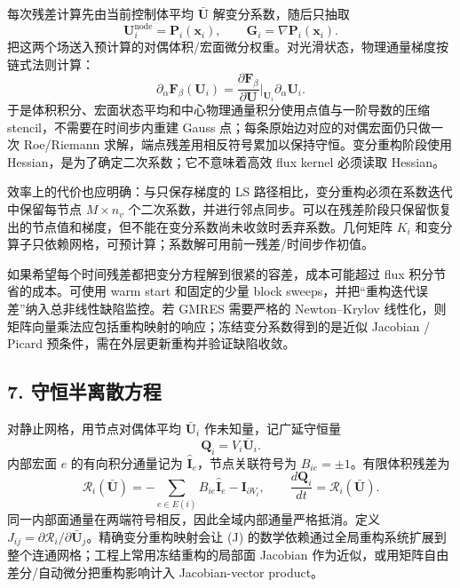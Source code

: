 \documentclass[
  12pt,
  UTF8]{ctexart}
\begin{document}
每次残差计算先由当前控制体平均 \(\bar{\boldsymbol U}\)
解变分系数，随后只抽取 \begin{equation}
\boldsymbol U_i^{\mathrm{node}}=\boldsymbol P_i(\boldsymbol x_i),\qquad
\boldsymbol G_i=\nabla\boldsymbol P_i(\boldsymbol x_i).\end{equation}
把这两个场送入预计算的对偶体积/宏面微分权重。对光滑状态，物理通量梯度按链式法则计算：
\begin{equation}
\partial_\alpha\boldsymbol F_\beta(\boldsymbol U_i)
=\frac{\partial\boldsymbol F_\beta}{\partial\boldsymbol U}
\bigg|_{\boldsymbol U_i}\partial_\alpha\boldsymbol U_i.\end{equation} 于是体积积分、宏面状态平均和中心物理通量积分使用点值与一阶导数的压缩
stencil，不需要在时间步内重建 Gauss
点；每条原始边对应的对偶宏面仍只做一次 Roe/Riemann
求解，端点残差用相反符号累加以保持守恒。变分重构阶段使用
Hessian，是为了确定二次系数；它不意味着高效 flux kernel 必须读取
Hessian。

效率上的代价也应明确：与只保存梯度的 LS
路径相比，变分重构必须在系数迭代中保留每节点 \(M\times n_v\)
个二次系数，并进行邻点同步。可以在残差阶段只保留恢复出的节点值和梯度，但不能在变分系数尚未收敛时丢弃系数。几何矩阵
\(K_i\)
和变分算子只依赖网格，可预计算；系数解可用前一残差/时间步作初值。

如果希望每个时间残差都把变分方程解到很紧的容差，成本可能超过 flux
积分节省的成本。可使用 warm start 和固定的少量 block
sweeps，并把``重构迭代误差''纳入总非线性缺陷监控。若 GMRES 需要严格的
Newton--Krylov
线性化，则矩阵向量乘法应包括重构映射的响应；冻结变分系数得到的是近似
Jacobian / Picard 预条件，需在外层更新重构并验证缺陷收敛。

\hypertarget{ux5b88ux6052ux534aux79bbux6563ux65b9ux7a0b}{%
\subsection{7.
守恒半离散方程}\label{ux5b88ux6052ux534aux79bbux6563ux65b9ux7a0b}}

对静止网格，用节点对偶体平均 \(\bar{\boldsymbol U}_i\)
作未知量，记广延守恒量 \begin{equation}
\boldsymbol Q_i=V_i\bar{\boldsymbol U}_i.\end{equation} 内部宏面 \(e\) 的有向积分通量记为
\(\widehat{\boldsymbol I}_e\)，节点关联符号为
\(B_{ie}=\pm1\)。有限体积残差为 \begin{equation}
\boldsymbol{\mathcal R}_i(\bar{\boldsymbol U})=
-\sum_{e\in E(i)}B_{ie}\widehat{\boldsymbol I}_e-
\boldsymbol I_{\partial V_i},\qquad
\boxed{\frac{d\boldsymbol Q_i}{dt}=\boldsymbol{\mathcal R}_i(\bar{\boldsymbol U}).}\end{equation} 同一内部面通量在两端符号相反，因此全域内部通量严格抵消。定义
\(J_{ij}=\partial\boldsymbol{\mathcal R}_i/\partial\bar{\boldsymbol U}_j\)。精确变分重构映射会让
(J)
的数学依赖通过全局重构系统扩展到整个连通网格；工程上常用冻结重构的局部面
Jacobian 作为近似，或用矩阵自由差分/自动微分把重构影响计入
Jacobian-vector product。
\end{document}
